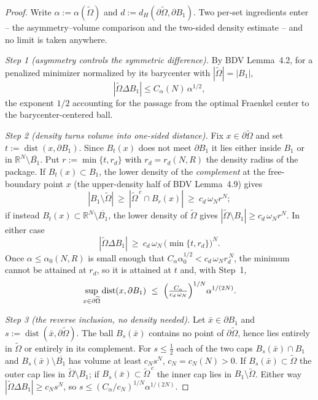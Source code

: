 \documentclass[11pt]{amsart}
\theoremstyle{definition}
\newcommand{\R}{\mathbb R}
\newcommand{\abs}[1]{\left|#1\right|}
\begin{document}
\begin{proof}
Write $\alpha:=\alpha(\widetilde\Omega)$ and
$d:=d_H(\partial\widetilde\Omega,\partial B_1)$. Two per-set ingredients enter
-- the asymmetry--volume comparison and the two-sided density estimate --
and no limit is taken anywhere.

\emph{Step 1 (asymmetry controls the symmetric difference).} By BDV Lemma~4.2,
for a penalized minimizer normalized by its barycenter with
$\abs{\widetilde\Omega}=\abs{B_1}$,
\[
\abs{\widetilde\Omega\Delta B_1}\le C_\alpha(N)\,\alpha^{1/2},
\]
the exponent $1/2$ accounting for the passage from the optimal Fraenkel
center to the barycenter-centered ball.

\emph{Step 2 (density turns volume into one-sided distance).} Fix
$x\in\partial\widetilde\Omega$ and set $t:=\operatorname{dist}(x,\partial B_1)$.
Since $B_t(x)$ does not meet $\partial B_1$ it lies either inside $B_1$ or in
$\R^N\setminus\overline{B_1}$. Put $r:=\min\{t,r_d\}$ with $r_d=r_d(N,R)$ the
density radius of the package. If $B_t(x)\subset B_1$, the lower density of the
\emph{complement} at the free-boundary point $x$ (the upper-density half of
BDV Lemma~4.9) gives
\[
\abs{B_1\setminus\widetilde\Omega}
\ \ge\ \abs{\widetilde\Omega^{\,c}\cap B_r(x)}
\ \ge\ c_d\,\omega_N r^{N};
\]
if instead $B_t(x)\subset\R^N\setminus\overline{B_1}$, the lower density of
$\widetilde\Omega$ gives $\abs{\widetilde\Omega\setminus B_1}\ge
c_d\,\omega_N r^{N}$. In either case
\[
\abs{\widetilde\Omega\Delta B_1}\ \ge\ c_d\,\omega_N\,
\bigl(\min\{t,r_d\}\bigr)^{N}.
\]
Once $\alpha\le\alpha_0(N,R)$ is small enough that
$C_\alpha\alpha_0^{1/2}<c_d\,\omega_N r_d^{\,N}$, the minimum cannot be
attained at $r_d$, so it is attained at $t$ and, with Step~1,
\[
\sup_{x\in\partial\widetilde\Omega}\operatorname{dist}(x,\partial B_1)
\ \le\ \Bigl(\tfrac{C_\alpha}{c_d\,\omega_N}\Bigr)^{1/N}\alpha^{1/(2N)} .
\]

\emph{Step 3 (the reverse inclusion, no density needed).} Let
$\bar x\in\partial B_1$ and $s:=\operatorname{dist}(\bar x,\partial\widetilde
\Omega)$. The ball $B_s(\bar x)$ contains no point of
$\partial\widetilde\Omega$, hence lies entirely in $\widetilde\Omega$ or
entirely in its complement. For $s\le\tfrac12$ each of the two caps
$B_s(\bar x)\cap B_1$ and $B_s(\bar x)\setminus\overline{B_1}$ has volume at
least $c_N s^{N}$, $c_N=c_N(N)>0$. If $B_s(\bar x)\subset\widetilde\Omega$ the
outer cap lies in $\widetilde\Omega\setminus B_1$; if
$B_s(\bar x)\subset\widetilde\Omega^{\,c}$ the inner cap lies in
$B_1\setminus\widetilde\Omega$. Either way $\abs{\widetilde\Omega\Delta
B_1}\ge c_N s^{N}$, so $s\le(C_\alpha/c_N)^{1/N}\alpha^{1/(2N)}$.


\end{proof}
\end{document}
